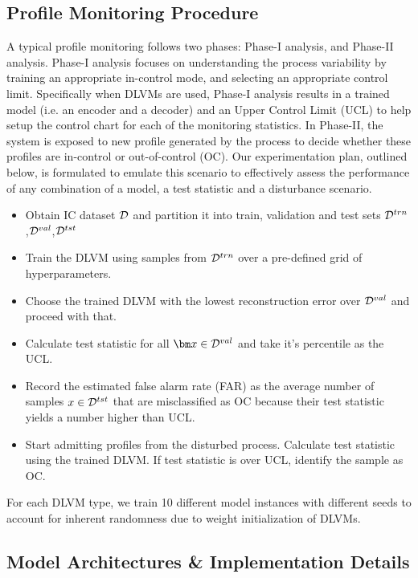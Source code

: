 \documentclass[journal, peerreview]{IEEEtran}
\begin{document}
\subsection{Profile Monitoring Procedure}
\label{sec:methodology:procedure}
A typical profile monitoring follows two phases: Phase-I analysis, and Phase-II analysis. Phase-I analysis focuses  on understanding the process variability by training an appropriate in-control mode, and selecting an appropriate control limit. 
Specifically when DLVMs are used, Phase-I analysis results in a trained model (i.e. an encoder and a decoder) and an Upper Control Limit (UCL) to help setup the control chart for each of the monitoring statistics.
In Phase-II, the system is exposed to new profile generated by the process to decide whether these profiles are in-control or out-of-control (OC).
Our experimentation plan, outlined below, is formulated to emulate this scenario to effectively assess the performance of any combination of a model, a test statistic and a disturbance scenario.
\begin{itemize}
	\item Obtain IC dataset $ \mathcal{D} $ and partition it into train, validation and test sets $ \mathcal{D}^{trn} $,$ \mathcal{D}^{val} $,$ \mathcal{D}^{tst} $
	\item Train the DLVM using samples from $\mathcal{D}^{trn}$ over a pre-defined grid of hyperparameters.
	\item Choose the trained DLVM with the lowest reconstruction error over $\mathcal{D}^{val}$ and proceed with that.
	\item Calculate test statistic for all $ \mbx \in \dataset^{val} $ and take it's  percentile as the UCL.
	\item Record the estimated false alarm rate (FAR)  as the average number of samples $ x \in \mathcal{D}^{tst} $ that are misclassified as OC because their test statistic yields a number higher than UCL.
	\item Start admitting profiles from the disturbed process. Calculate test statistic using the trained DLVM. If test statistic is over UCL, identify the sample as OC.
\end{itemize}
For each DLVM type, we train 10 different model instances with different seeds to account for inherent randomness due to weight initialization of DLVMs.

\subsection{Model Architectures \& Implementation Details}
 
\end{document}
